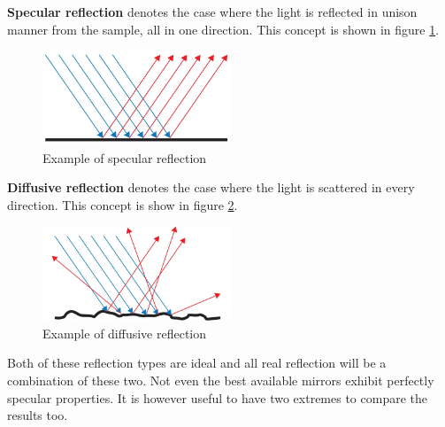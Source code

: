 \documentclass{article}
\begin{document}
\textbf{Specular reflection} denotes the case where the light is reflected in unison manner from the sample, all in one direction. This concept is shown in figure \ref{fig:specular_reflection}.

\begin{figure}[h!]
    \centering
    \includegraphics[width=0.5\textwidth]{figures/theory/Specular-Reflection.png}
    \caption{Example of specular reflection \cite{SpecularReflectionOcean}}
    \label{fig:specular_reflection}
\end{figure}

\textbf{Diffusive reflection} denotes the case where the light is scattered in every direction. This concept is show in figure \ref{fig:diffusive_reflection}.

\begin{figure}[h!]
    \centering
    \includegraphics[width=0.5\textwidth]{figures/theory/Diffuse-Reflection.png}
    \caption{Example of diffusive reflection \cite{DiffuseReflectionOcean}}
    \label{fig:diffusive_reflection}
\end{figure}

Both of these reflection types are ideal and all real reflection will be a combination of these two. Not even the best available mirrors exhibit perfectly specular properties. It is however useful to have two extremes to compare the results too. 


\end{document}
